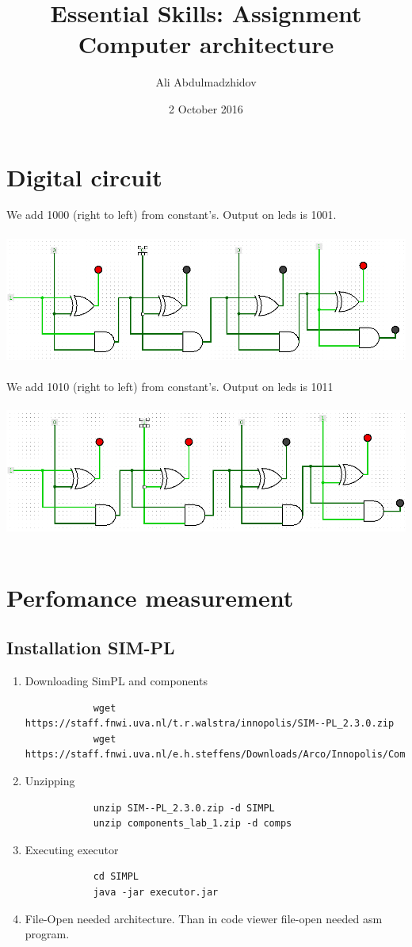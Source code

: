 \documentclass[10pt]{article}
\title{Essential Skills: Assignment Computer architecture}
\date{2 October 2016}
\author{Ali Abdulmadzhidov}
\begin{document}
\renewcommand*\rmdefault{cmss}
\maketitle
\section{Digital circuit}
We add 1000 (right to left) from constant's. Output on leds is 1001. \\ \\
\includegraphics[width=\textwidth, scale=0.5]{circuit1} \\ \\
We add 1010 (right to left) from constant's. Output on leds is 1011 \\ \\
\includegraphics[width=\textwidth, scale=0.5]{circuit2} \\ \\

\section{Perfomance measurement}
\subsection{Installation SIM-PL}
\begin{enumerate}
	\item Downloading SimPL and components
		\begin{verbatim}
			wget https://staff.fnwi.uva.nl/t.r.walstra/innopolis/SIM-­‐PL_2.3.0.zip
			wget https://staff.fnwi.uva.nl/e.h.steffens/Downloads/Arco/Innopolis/Component_Lab_1.zip	
		\end{verbatim}
	\item Unzipping
		\begin{verbatim}
			unzip SIM-­‐PL_2.3.0.zip -d SIMPL
			unzip components_lab_1.zip -d comps
		\end{verbatim}
	\item Executing executor
		\begin{verbatim}
			cd SIMPL
			java -jar executor.jar
		\end{verbatim}
	\item File-Open needed architecture. Than in code viewer file-open needed asm program. 
\end{enumerate}
\end{document}
